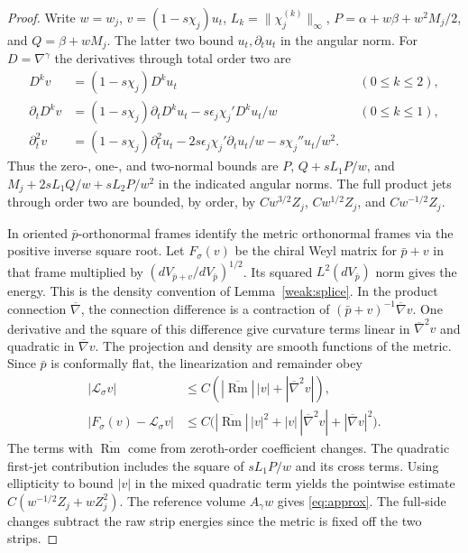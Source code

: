\documentclass[11pt,letterpaper]{article}
\numberwithin{equation}{section}
\DeclareMathOperator{\Rm}{Rm}
\newcommand{\rd}{\gamma}
\begin{document}
\begin{proof}
Write \(w=w_j\), \(v=(1-s\chi_j)u_t\),
\(L_k=\|\chi_j^{(k)}\|_\infty\),
\(P=\alpha+w\beta+w^2 M_j/2\), and \(Q=\beta+w M_j\).
The latter two bound \(u_t,\partial_tu_t\) in the angular norm.
For \(D=\nabla^\rd\) the derivatives through total order two are
\[
 \begin{aligned}
 D^k v&=(1-s\chi_j)D^ku_t &&(0\le k\le2),\\
 \partial_t D^k v&=(1-s\chi_j)\partial_tD^ku_t
       -s\epsilon_j\chi_j'D^ku_t/w &&(0\le k\le1),\\
 \partial_t^2 v&=(1-s\chi_j)\partial_t^2u_t
       -2s\epsilon_j\chi_j'\partial_tu_t/w-s\chi_j''u_t/w^2 .
 \end{aligned}
\]
Thus the zero-, one-, and two-normal bounds are \(P\),
\(Q+sL_1P/w\), and \(M_j+2sL_1Q/w+sL_2P/w^2\) in the
indicated angular norms. The full product jets through order two
are bounded, by order, by \(Cw^{3/2}Z_j\), \(Cw^{1/2}Z_j\),
and \(Cw^{-1/2}Z_j\).

In oriented \(\bar p\)-orthonormal frames identify the metric
orthonormal frames via the positive inverse square root.
Let \(F_\sigma(v)\) be the chiral Weyl matrix for \(\bar p+v\)
in that frame multiplied by \((dV_{\bar p+v}/dV_{\bar p})^{1/2}\).
Its squared \(L^2(dV_{\bar p})\) norm gives the energy. This is
the density convention of Lemma~\ref{weak:splice}. In the product connection
\(\overline\nabla\), the connection difference is a contraction
of \((\bar p+v)^{-1}\overline\nabla v\). One derivative and the
square of this difference give curvature terms linear in
\(\overline\nabla^2v\) and quadratic in \(\overline\nabla v\).
The projection and density are smooth functions of the metric.
Since \(\bar p\) is conformally flat, the linearization and remainder
obey
\[
 \begin{aligned}
 |\mathcal L_\sigma v|&\le
     C(|\overline{\Rm}|\,|v|+|\overline\nabla^2v|),\\
 |F_\sigma(v)-\mathcal L_\sigma v|&\le
     C\bigl(|\overline{\Rm}|\,|v|^2+
            |v|\,|\overline\nabla^2v|+|\overline\nabla v|^2\bigr).
 \end{aligned}
\]
The terms with \(\overline{\Rm}\) come from zeroth-order
coefficient changes. The quadratic first-jet contribution includes
the square of \(sL_1P/w\) and its cross terms. Using ellipticity
to bound \(|v|\) in the mixed quadratic term yields the pointwise
estimate \(C(w^{-1/2}Z_j+w Z_j^2)\). The reference volume
\(A_\rd w\) gives \eqref{eq:approx}. The full-side changes
subtract the raw strip energies since the metric is fixed
off the two strips.
\end{proof}
\end{document}
